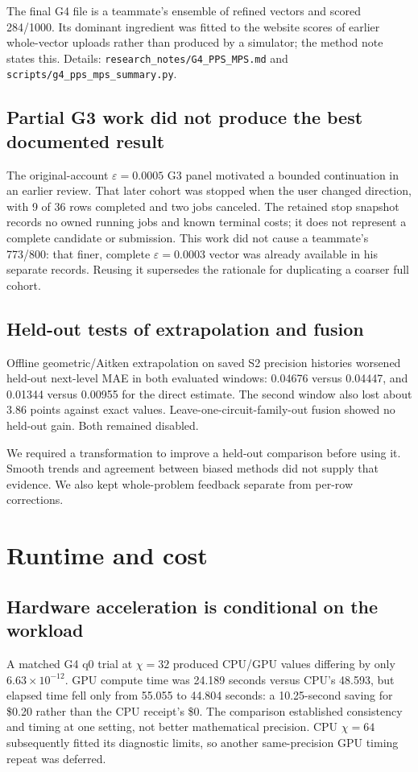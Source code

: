 \documentclass[11pt]{article}
\newcommand{\file}[1]{\nolinkurl{#1}}
\newcommand{\eps}{\varepsilon}
\begin{document}
The final G4 file is a teammate's ensemble of refined vectors and scored 284/1000. Its dominant ingredient was fitted to the website scores of earlier whole-vector uploads rather than produced by a simulator; the method note states this. Details: \file{research_notes/G4_PPS_MPS.md} and \file{scripts/g4_pps_mps_summary.py}.

\subsection{Partial G3 work did not produce the best documented result}
The original-account $\eps=0.0005$ G3 panel motivated a bounded continuation in an earlier review. That later cohort was stopped when the user changed direction, with 9 of 36 rows completed and two jobs canceled. The retained stop snapshot records no owned running jobs and known terminal costs; it does not represent a complete candidate or submission.\cite{stop} This work did not cause a teammate's 773/800: that finer, complete $\eps=0.0003$ vector was already available in his separate records. Reusing it supersedes the rationale for duplicating a coarser full cohort.\cite{ledger,decisions}

\subsection{Held-out tests of extrapolation and fusion}
Offline geometric/Aitken extrapolation on saved S2 precision histories worsened held-out next-level MAE in both evaluated windows: 0.04676 versus 0.04447, and 0.01344 versus 0.00955 for the direct estimate. The second window also lost about 3.86 points against exact values. Leave-one-circuit-family-out fusion showed no held-out gain. Both remained disabled.\cite{rejections,calibration}

We required a transformation to improve a held-out comparison before using it. Smooth trends and agreement between biased methods did not supply that evidence. We also kept whole-problem feedback separate from per-row corrections.

\newpage
\section{Runtime and cost}
\subsection{Hardware acceleration is conditional on the workload}
A matched G4 q0 trial at $\chi=32$ produced CPU/GPU values differing by only $6.63\times10^{-12}$. GPU compute time was 24.189 seconds versus CPU's 48.593, but elapsed time fell only from 55.055 to 44.804 seconds: a 10.25-second saving for \$0.20 rather than the CPU receipt's \$0. The comparison established consistency and timing at one setting, not better mathematical precision. CPU $\chi=64$ subsequently fitted its diagnostic limits, so another same-precision GPU timing repeat was deferred.\cite{gpu}
\end{document}
